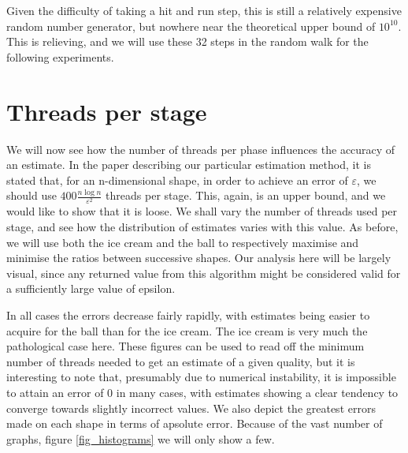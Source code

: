 Given the difficulty of taking a hit and run step, this is still a relatively expensive random number generator, but nowhere near the theoretical upper bound of $10^{10}$. This is relieving, and we will use these 32 steps in the random walk for the following experiments.


\section{Threads per stage}\label{sec_error}

We will now see how the number of threads per phase influences the accuracy of an estimate. In the paper describing our particular estimation method, it is stated that, for an n-dimensional shape, in order to achieve an error of $\varepsilon$, we should use $400\frac{n\log n}{\varepsilon^2}$ threads per stage. This, again, is an upper bound, and we would like to show that it is loose. We shall vary the number of threads used per stage, and see how the distribution of estimates varies with this value. As before, we will use both the ice cream and the ball to respectively maximise and minimise the ratios between successive shapes. Our analysis here will be largely visual, since any returned value from this algorithm might be considered valid for a sufficiently large value of epsilon.

In all cases the errors decrease fairly rapidly, with estimates being easier to acquire for the ball than for the ice cream. The ice cream is very much the pathological case here. These figures can be used to read off the minimum number of threads needed to get an estimate of a given quality, but it is interesting to note that, presumably due to numerical instability, it is impossible to attain an error of 0 in many cases, with estimates showing a clear tendency to converge towards slightly incorrect values. We also depict the greatest errors made on each shape in terms of apsolute error. Because of the vast number of graphs, figure \ref{fig_histograms} we will only show a few.


